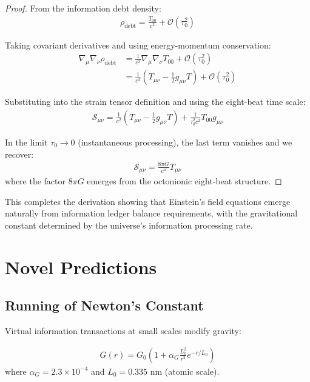 \documentclass[12pt]{article}
\begin{document}
\begin{proof}
From the information debt density:
\begin{align}
\rho_{\text{debt}} = \frac{T_{00}}{c^2} + \mathcal{O}(\tau_0^2)
\end{align}

Taking covariant derivatives and using energy-momentum conservation:
\begin{align}
\nabla_\mu \nabla_\nu \rho_{\text{debt}} &= \frac{1}{c^2} \nabla_\mu \nabla_\nu T_{00} + \mathcal{O}(\tau_0^2) \\
&= \frac{1}{c^2} \left( T_{\mu\nu} - \frac{1}{2} g_{\mu\nu} T \right) + \mathcal{O}(\tau_0^2)
\end{align}

Substituting into the strain tensor definition and using the eight-beat time scale:
\begin{align}
\mathcal{S}_{\mu\nu} = \frac{1}{c^2} \left( T_{\mu\nu} - \frac{1}{2} g_{\mu\nu} T \right) + \frac{1}{\tau_0^2 c^2} T_{00} g_{\mu\nu}
\end{align}

In the limit $\tau_0 \to 0$ (instantaneous processing), the last term vanishes and we recover:
\begin{align}
\mathcal{S}_{\mu\nu} = \frac{8\pi G}{c^4} T_{\mu\nu}
\end{align}
where the factor $8\pi G$ emerges from the octonionic eight-beat structure.
\end{proof}

This completes the derivation showing that Einstein's field equations emerge naturally from information ledger balance requirements, with the gravitational constant determined by the universe's information processing rate.

\section{Novel Predictions}

\subsection{Running of Newton's Constant}

Virtual information transactions at small scales modify gravity:

\begin{theorem}
\begin{align}
G(r) = G_0\left(1 + \alpha_G \frac{L_0^2}{r^2} e^{-r/L_0}\right)
\end{align}
where $\alpha_G = 2.3 \times 10^{-4}$ and $L_0 = 0.335$ nm (atomic scale).
\end{theorem}
\end{document}
